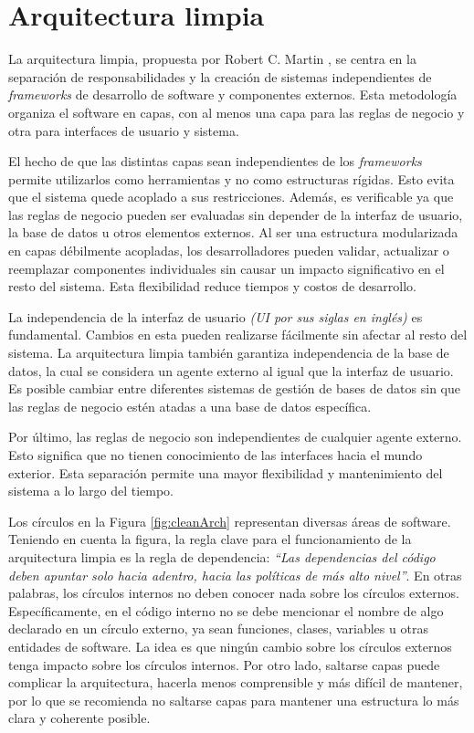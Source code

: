 \section{Arquitectura limpia}
\label{sec:arqLimpia}
La arquitectura limpia, propuesta por Robert C. Martin \cite{martin2017clean}, se centra en la separación de responsabilidades y la creación de sistemas independientes de \textit{frameworks} de desarrollo de software y componentes externos. Esta metodología organiza el software en capas, con al menos una capa para las reglas de negocio y otra para interfaces de usuario y sistema.


El hecho de que las distintas capas sean independientes de los \textit{frameworks} permite utilizarlos como herramientas y no como estructuras rígidas. Esto evita que el sistema quede acoplado a sus restricciones. Además, es verificable ya que las reglas de negocio pueden ser evaluadas sin depender de la interfaz de usuario, la base de datos u otros elementos externos. Al ser una estructura modularizada en capas débilmente acopladas, los desarrolladores pueden validar, actualizar o reemplazar componentes individuales sin causar un impacto significativo en el resto del sistema. Esta flexibilidad reduce tiempos y costos de desarrollo. 

La independencia de la interfaz de usuario \textit{(UI por sus siglas en inglés)} es fundamental. Cambios en esta pueden realizarse fácilmente sin afectar al resto del sistema. La arquitectura limpia también garantiza independencia de la base de datos, la cual se considera un agente externo al igual que la interfaz de usuario. Es posible cambiar entre diferentes sistemas de gestión de bases de datos sin que las reglas de negocio estén atadas a una base de datos específica.

Por último, las reglas de negocio son independientes de cualquier agente externo. Esto significa que no tienen conocimiento de las interfaces hacia el mundo exterior. Esta separación permite una mayor flexibilidad y mantenimiento del sistema a lo largo del tiempo.

Los círculos en la Figura \ref{fig:cleanArch} representan diversas áreas de software. Teniendo en cuenta la figura, la regla clave para el funcionamiento de la arquitectura limpia es la regla de dependencia: \textit{``Las dependencias del código deben apuntar solo hacia adentro, hacia las políticas de más alto nivel''}\cite{martin2017clean}. En otras palabras, los círculos internos no deben conocer nada sobre los círculos externos. Específicamente, en el código interno no se debe mencionar el nombre de algo declarado en un círculo externo, ya sean funciones, clases, variables u otras entidades de software. La idea es que ningún cambio sobre los círculos externos tenga impacto sobre los círculos internos. Por otro lado, saltarse capas puede complicar la arquitectura, hacerla menos comprensible y más difícil de mantener, por lo que se recomienda no saltarse capas para mantener una estructura lo más clara y coherente posible.

